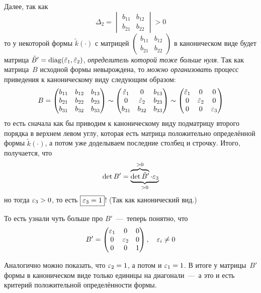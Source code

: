 \documentclass[a4paper,12pt]{article}
\begin{document}
\begin{example}
    Далее, так как
    \[
      \Delta_2 = \begin{vmatrix}
        b_{11} & b_{12}\\
        b_{21} & b_{22}
      \end{vmatrix} > 0
    \]
    то у некоторой формы $\tilde k(\cdot)$ с матрицей $\left(
      \begin{smallmatrix}
        b_{11} & b_{12}\\
        b_{21} & b_{22}
      \end{smallmatrix}
    \right)$ в каноническом виде будет матрица $\tilde B' \hm= \diag(\tilde \eps_1, \tilde \eps_2)$, \emph{определитель которой тоже больше нуля}.
    Так как матрица~$B$ исходной формы невырождена, то \emph{можно организовать} процесс приведения к каноническому виду следующим образом:
    \[
      B = \begin{pmatrix}
        b_{11} & b_{12} & b_{13}\\
        b_{21} & b_{22} & b_{23}\\
        b_{31} & b_{32} & b_{33}
      \end{pmatrix} \sim \begin{pmatrix}
        \tilde {\varepsilon}_1 & 0             & b_{13}\\
        0             & \tilde {\varepsilon}_2 & b_{23}\\
        b_{31} & b_{32} & b_{33}
      \end{pmatrix} \sim \begin{pmatrix}
        \tilde {\varepsilon}_1 & 0             & 0\\
        0             & \tilde {\varepsilon}_2 & 0\\
        0             & 0             & \varepsilon_3
      \end{pmatrix}
    \]
    то есть сначала как бы приводим к каноническому виду подматрицу второго порядка в верхнем левом углу, которая есть матрица положительно определённой формы $\tilde k(\cdot)$, а потом уже доделываем последние столбец и строчку.
    Итого, получается, что
    \[
      \det B' = \underbrace{\overbrace{\det \tilde B'}^{> 0} \cdot \varepsilon_3}_{> 0}
    \]
    но тогда $\eps_3 \hm> 0$, то есть $\boxed{\eps_3 \hm= 1}$!
    (Так как канонический вид.)
    
    То есть узнали чуть больше про $B'$~---~теперь понятно, что
    \[
      B' = \begin{pmatrix}
        \varepsilon_1 & 0      & 0\\
        0      & \varepsilon_2 & 0\\
        0      & 0      & 1
      \end{pmatrix},\quad \varepsilon_i \not= 0
    \]
    
    Аналогично можно показать, что $\eps_2 \hm= 1$, а потом и $\eps_1 \hm= 1$.
    В итоге у матрицы~$B'$ формы в каноническом виде только единицы на диагонали~---~а это и есть критерий положительной определённости формы.
  \end{example}
  
\end{document}
